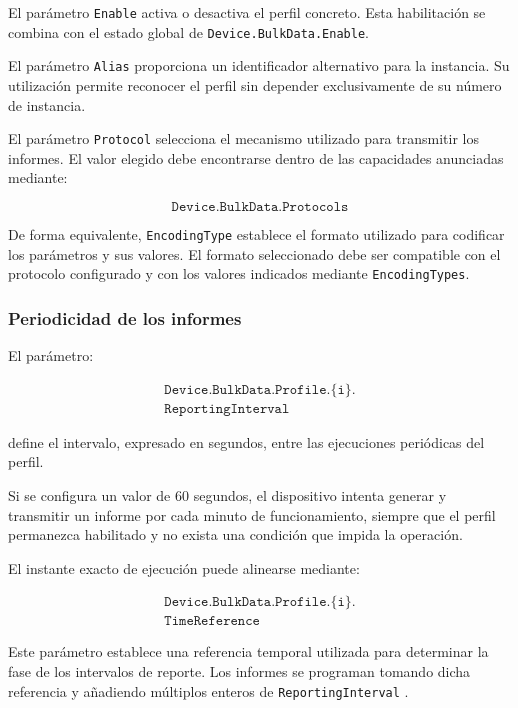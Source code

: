 El parámetro \texttt{Enable} activa o desactiva el perfil concreto. Esta
habilitación se combina con el estado global de
\texttt{Device.BulkData.Enable}.

El parámetro \texttt{Alias} proporciona un identificador alternativo para
la instancia. Su utilización permite reconocer el perfil sin depender
exclusivamente de su número de instancia.

El parámetro \texttt{Protocol} selecciona el mecanismo utilizado para
transmitir los informes. El valor elegido debe encontrarse dentro de las
capacidades anunciadas mediante:

\[
    \texttt{Device.BulkData.Protocols}
\]

De forma equivalente, \texttt{EncodingType} establece el formato
utilizado para codificar los parámetros y sus valores. El formato
seleccionado debe ser compatible con el protocolo configurado y con los
valores indicados mediante \texttt{EncodingTypes}.


\subsubsection*{Periodicidad de los informes}

El parámetro:

\[
\begin{split}
    \texttt{Device.BulkData.Profile.\{i\}.}\\
    \texttt{ReportingInterval}
\end{split}
\]

define el intervalo, expresado en segundos, entre las ejecuciones
periódicas del perfil.

Si se configura un valor de 60 segundos, el dispositivo intenta generar
y transmitir un informe por cada minuto de funcionamiento, siempre que
el perfil permanezca habilitado y no exista una condición que impida la
operación.

El instante exacto de ejecución puede alinearse mediante:

\[
\begin{split}
    \texttt{Device.BulkData.Profile.\{i\}.}\\
    \texttt{TimeReference}
\end{split}
\]

Este parámetro establece una referencia temporal utilizada para
determinar la fase de los intervalos de reporte. Los informes se
programan tomando dicha referencia y añadiendo múltiplos enteros de
\texttt{ReportingInterval} \cite{bbf_tr181}.

